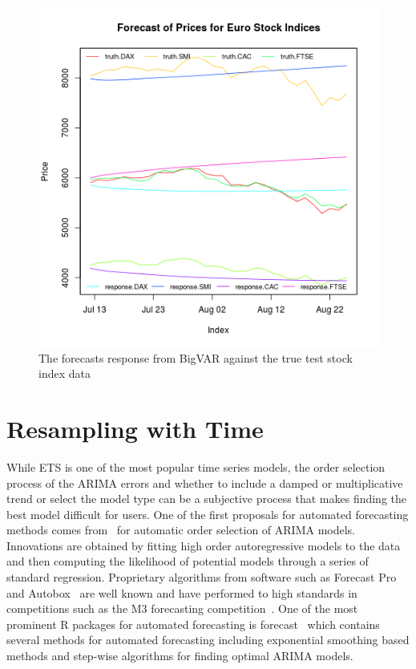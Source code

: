 \documentclass[12pt]{article}\usepackage[]{graphicx}\usepackage[]{color}
\theoremstyle{definition}
\let\proglang=\textsf
\newcommand{\pkg}[1]{{\fontseries{b}\selectfont #1}}
\begin{document}
\begin{figure}[H]
\includegraphics[width=\linewidth]{plot_bigvar_train.png}
\centering
\caption{The forecasts response from BigVAR against the true test stock index data}
\label{fig:bigvar_train}
\end{figure}
\doublespacing

\section{Resampling with Time}
\label{sec:resamp}


While ETS is one of the most popular time series models, the order selection process of the ARIMA errors and whether to include a damped or multiplicative trend or select the model type can be a subjective process that makes finding the best model difficult for users. One of the first proposals for automated forecasting methods comes from~\cite{hannanOrder} for automatic order selection of ARIMA models. Innovations are obtained by fitting high order autoregressive models to the data and then computing the likelihood of potential models through a series of standard regression. Proprietary algorithms from software such as \proglang{Forecast Pro}~\cite{forecastpro} and \proglang{Autobox}~\cite{reillyautobox} are well known and have performed to high standards in competitions such as the M3 forecasting competition~\cite{Makridakis2000451}. One of the most prominent R packages for automated forecasting is \pkg{forecast}~\cite{HyndForecast} which contains several methods for automated forecasting including exponential smoothing based methods and step-wise algorithms for finding optimal ARIMA models.
\end{document}
